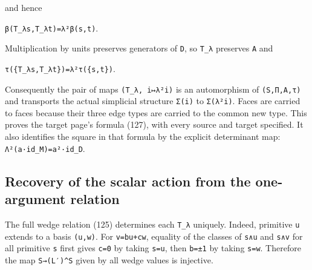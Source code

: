 \documentclass[
  10pt,
]{article}
\begin{document}
and hence

\texttt{\small β(\allowbreak{}T\_\allowbreak{}λs,\allowbreak{}T\_\allowbreak{}λt)\allowbreak{}=\allowbreak{}λ²β(\allowbreak{}s,\allowbreak{}t)\allowbreak{}}.

Multiplication by units preserves generators of \texttt{\small D}, so
\texttt{\small T\_\allowbreak{}λ} preserves \texttt{\small A} and

\texttt{\small τ(\allowbreak{}\{T\_\allowbreak{}λs,\allowbreak{}T\_\allowbreak{}λt\})\allowbreak{}=\allowbreak{}λ²τ(\allowbreak{}\{s,\allowbreak{}t\})\allowbreak{}}.

Consequently the pair of maps
\texttt{\small (\allowbreak{}T\_\allowbreak{}λ,\allowbreak{} i↦λ²i)\allowbreak{}}
is an automorphism of
\texttt{\small (\allowbreak{}S,\allowbreak{}Π,\allowbreak{}A,\allowbreak{}τ)\allowbreak{}}
and transports the actual simplicial structure
\texttt{\small Σ(\allowbreak{}i)\allowbreak{}} to
\texttt{\small Σ(\allowbreak{}λ²i)\allowbreak{}}. Faces are carried to
faces because their three edge types are carried to the common new type.
This proves the target page's formula (127), with every source and
target specified. It also identifies the square in that formula by the
explicit determinant map:
\texttt{\small Λ²(\allowbreak{}a·id\_\allowbreak{}M)\allowbreak{}=\allowbreak{}a²·id\_\allowbreak{}D}.

\subsection{Recovery of the scalar action from the one-argument
relation}\label{recovery-of-the-scalar-action-from-the-one-argument-relation}

The full wedge relation (125) determines each
\texttt{\small T\_\allowbreak{}λ} uniquely. Indeed, primitive
\texttt{\small u} extends to a basis
\texttt{\small (\allowbreak{}u,\allowbreak{}w)\allowbreak{}}. For
\texttt{\small v=\allowbreak{}bu+\allowbreak{}cw}, equality of the
classes of \texttt{\small s∧u} and \texttt{\small s∧v} for all primitive
\texttt{\small s} first gives \texttt{\small c=\allowbreak{}0} by taking
\texttt{\small s=\allowbreak{}u}, then \texttt{\small b=\allowbreak{}±1}
by taking \texttt{\small s=\allowbreak{}w}. Therefore the map
\texttt{\small S→\allowbreak{}(\allowbreak{}L′)\allowbreak{}\textasciicircum{}S}
given by all wedge values is injective.
\end{document}
